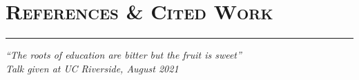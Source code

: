 \documentclass[]{article}
\makeatletter
\newcommand{\vhrulefill}[1]{\leavevmode\leaders\hrule\@height#1\hfill \kern\z@}
\makeatother
\begin{document}
\BgThispage
\pagestyle{alldocument}

\section*{\fontsize{16}{48}\selectfont \textsc{References \& Cited Work}}
\vspace{-4mm}
\hspace{0.165\textwidth}\vhrulefill{0.4pt}

\begin{flushright}
\textit{``The roots of education are bitter but the fruit is sweet''\\
Talk given at UC Riverside, August 2021}
\end{flushright}

\vspace{-6mm}

\nocite{*} 


 
\end{document}
